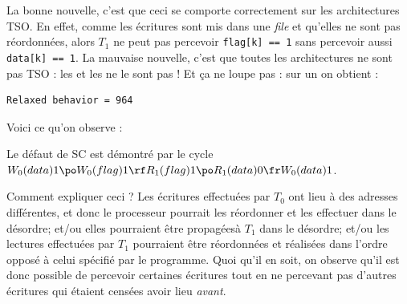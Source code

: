 La bonne nouvelle, c'est que ceci se comporte correctement sur les architectures
TSO. En effet, comme les écritures sont mis dans une \emph{file} et qu'elles ne
sont pas réordonnées, alors $T_1$ ne peut pas percevoir \texttt{flag[k] == 1}
sans percevoir aussi \texttt{data[k] == 1}. La mauvaise nouvelle,
c'est que toutes les architectures ne sont pas TSO : les  et les
 ne le sont pas ! Et ça ne loupe pas : sur un  on obtient :
\begin{verbatim}
Relaxed behavior = 964
\end{verbatim}

Voici ce qu'on observe :

\begin{center}
\end{center}

Le défaut de SC est démontré par le cycle
$W_0(data)1 \po W_0(flag)1 \rf R_1(flag)1 \po R_1(data)0 \fr W_0(data)1$.

Comment expliquer ceci ? Les écritures effectuées par $T_0$ ont lieu à des
adresses différentes, et donc le processeur pourrait les réordonner et les
effectuer dans le désordre; et/ou elles pourraient être \og propagées\fg à $T_1$
dans le désordre; et/ou les lectures effectuées par $T_1$ pourraient être
réordonnées et réalisées dans l'ordre opposé à celui spécifié par le
programme. Quoi qu'il en soit, on observe qu'il est donc possible de percevoir
certaines écritures tout en ne percevant pas d'autres écritures qui étaient
censées avoir lieu \emph{avant}.

